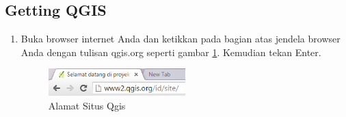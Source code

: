\subsection{Getting QGIS}
\begin{enumerate}
\item
Buka browser internet Anda dan ketikkan pada bagian atas jendela browser Anda dengan tulisan qgis.org seperti gambar \ref{image1}. Kemudian tekan Enter.
\begin{figure}[ht]
        \centerline{\includegraphics[width=0.5\textwidth]{figures/image1}}
        \caption{Alamat Situs Qgis}
        \label{image1}
        \end{figure}


\end{enumerate}
